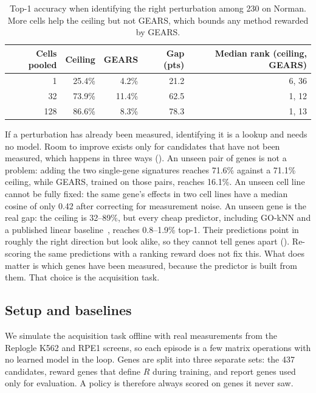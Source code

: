 \documentclass[11pt, letterpaper]{cmu}
\let\Cref\crtCref
\begin{document}
\begin{table}[h]
\centering\small
\begin{tabular}{rrrrr}
\toprule
Cells pooled & Ceiling & GEARS & Gap (pts) & Median rank (ceiling, GEARS)\\
\midrule
1   & 25.4\% & 4.2\% & 21.2 & 6, 36\\
32  & 73.9\% & 11.4\% & 62.5 & 1, 12\\
128 & 86.6\% & 8.3\% & 78.3 & 1, 13\\
\bottomrule
\end{tabular}
\caption{Top-1 accuracy when identifying the right perturbation among 230 on Norman. More
cells help the ceiling but not GEARS, which bounds any method rewarded by GEARS.}
\label{tab:ladder}
\end{table}

If a perturbation has already been measured, identifying it is a lookup and needs no model.
Room to improve exists only for candidates that have not been measured, which happens in three
ways (\Cref{fig:headroom}). An unseen pair of genes is not a problem: adding the two single-gene
signatures reaches 71.6\% against a 71.1\% ceiling, while GEARS, trained on those pairs, reaches
16.1\%. An unseen cell line cannot be fully fixed: the same gene's effects in two cell lines have
a median cosine of only 0.42 after correcting for measurement noise. An unseen gene is the real
gap: the ceiling is 32--89\%, but every cheap predictor, including GO-kNN and a published linear
baseline~\citep{ahlmanneltze2025linear}, reaches 0.8--1.9\% top-1. Their predictions point in
roughly the right direction but look alike, so they cannot tell genes apart (\Cref{fig:gap}).
Re-scoring the same predictions with a ranking reward does not fix this. What does matter is
which genes have been measured, because the predictor is built from them. That choice is the
acquisition task.

\subsection{Setup and baselines}
\label{sec:mdp}

We simulate the acquisition task offline with real measurements from the Replogle K562 and RPE1
screens, so each episode is a few matrix operations with no learned model in the loop. Genes are
split into three separate sets: the 437 candidates, reward genes that define $R$ during
training, and report genes used only for evaluation. A policy is therefore always scored on
genes it never saw.
\end{document}
